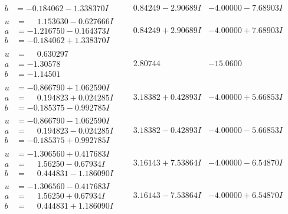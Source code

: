 \documentclass[1p]{elsarticle_modified}
\theoremstyle{definition}
\begin{document}
$$\begin{array}{c|c|c}
\begin{aligned}
b &= -0.184062 - 1.338370 I\end{aligned}
 & \phantom{-}0.84249 - 2.90689 I & -4.00000 - 7.68903 I \\ \hline\begin{aligned}
u &= \phantom{-}1.153630 - 0.627666 I \\
a &= -1.216750 - 0.164373 I \\
b &= -0.184062 + 1.338370 I\end{aligned}
 & \phantom{-}0.84249 + 2.90689 I & -4.00000 + 7.68903 I \\ \hline\begin{aligned}
u &= \phantom{-}0.630297\phantom{ +0.000000I} \\
a &= -1.30578\phantom{ +0.000000I} \\
b &= -1.14501\phantom{ +0.000000I}\end{aligned}
 & \phantom{-}2.80744\phantom{ +0.000000I} & -15.0600\phantom{ +0.000000I} \\ \hline\begin{aligned}
u &= -0.866790 + 1.062590 I \\
a &= \phantom{-}0.194823 + 0.024285 I \\
b &= -0.185375 - 0.992785 I\end{aligned}
 & \phantom{-}3.18382 + 0.42893 I & -4.00000 + 5.66853 I \\ \hline\begin{aligned}
u &= -0.866790 - 1.062590 I \\
a &= \phantom{-}0.194823 - 0.024285 I \\
b &= -0.185375 + 0.992785 I\end{aligned}
 & \phantom{-}3.18382 - 0.42893 I & -4.00000 - 5.66853 I \\ \hline\begin{aligned}
u &= -1.306560 + 0.417683 I \\
a &= \phantom{-}1.56250 - 0.67934 I \\
b &= \phantom{-}0.444831 - 1.186090 I\end{aligned}
 & \phantom{-}3.16143 + 7.53864 I & -4.00000 - 6.54870 I \\ \hline\begin{aligned}
u &= -1.306560 - 0.417683 I \\
a &= \phantom{-}1.56250 + 0.67934 I \\
b &= \phantom{-}0.444831 + 1.186090 I\end{aligned}
 & \phantom{-}3.16143 - 7.53864 I & -4.00000 + 6.54870 I \\ \hline\begin{aligned}

\end{aligned}
\end{array}$$
\end{document}
